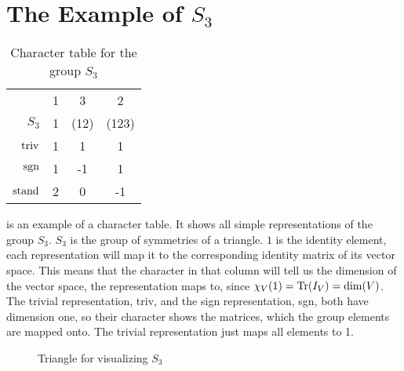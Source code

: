 \section{The Example of $S_3$}

\begin{table}
    \centering

    \begin{tabular}{r | c  c  c}
                    & 1 & 3     & 2     \\
        $S_3$       & 1 & (12)  & (123) \\ \hline
        $\operatorname{triv}$     & 1 & 1     & 1     \\
        $\operatorname{sgn}$      & 1 & -1    & 1     \\
        $\operatorname{stand}$    & 2 & 0     & -1
    \end{tabular}

    \caption{Character table for the group $S_3$}
    \label{tab:reprep.char.table}
\end{table}

 is an example of a character table.
It shows all simple representations of the group $S_3$.
$S_3$ is the group of symmetries of a triangle.
$1$ is the identity element, each representation will map it to the corresponding identity matrix of its vector space.
This means that the character in that column will tell us the dimension of the vector space, the representation maps to, since $\chi_V(1) = \operatorname{Tr}(I_V) = \dim(V)$.
The trivial representation, triv, and the sign representation, sgn, both have dimension one, so their character shows the matrices, which the group elements are mapped onto.
The trivial representation just maps all elements to 1.

\begin{figure}[!h]
    \centering
    

    \caption{Triangle for visualizing $S_3$}
    \label{fig:reprep.char.triangle}
\end{figure}

